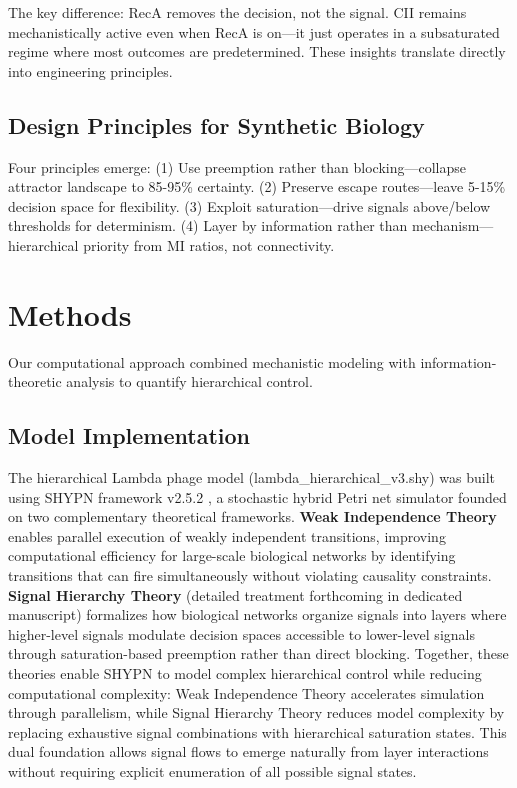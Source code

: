 \documentclass[10pt,twocolumn]{article}
\begin{document}
The key difference: RecA removes the decision, not the signal. CII remains mechanistically active even when RecA is on—it just operates in a subsaturated regime where most outcomes are predetermined. These insights translate directly into engineering principles.

\subsection{Design Principles for Synthetic Biology}

Four principles emerge: (1) Use preemption rather than blocking—collapse attractor landscape to 85-95\% certainty. (2) Preserve escape routes—leave 5-15\% decision space for flexibility. (3) Exploit saturation—drive signals above/below thresholds for determinism. (4) Layer by information rather than mechanism—hierarchical priority from MI ratios, not connectivity.

\section{Methods}

Our computational approach combined mechanistic modeling with information-theoretic analysis to quantify hierarchical control.

\subsection{Model Implementation}

The hierarchical Lambda phage model (lambda\_hierarchical\_v3.shy) was built using SHYPN framework v2.5.2 \cite{shypn2025}, a stochastic hybrid Petri net simulator \cite{heiner2008,chaouiya2007,koch2011} founded on two complementary theoretical frameworks. \textbf{Weak Independence Theory} \cite{simao2025weak} enables parallel execution of weakly independent transitions, improving computational efficiency for large-scale biological networks by identifying transitions that can fire simultaneously without violating causality constraints. \textbf{Signal Hierarchy Theory} (detailed treatment forthcoming in dedicated manuscript) formalizes how biological networks organize signals into layers where higher-level signals modulate decision spaces accessible to lower-level signals through saturation-based preemption rather than direct blocking. Together, these theories enable SHYPN to model complex hierarchical control while reducing computational complexity: Weak Independence Theory accelerates simulation through parallelism, while Signal Hierarchy Theory reduces model complexity by replacing exhaustive signal combinations with hierarchical saturation states. This dual foundation allows signal flows to emerge naturally from layer interactions without requiring explicit enumeration of all possible signal states.
\end{document}
